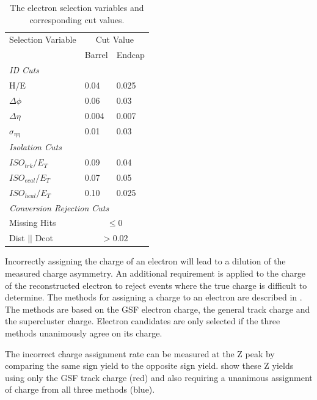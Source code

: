 \begin{table}[htbp]
  \begin{center}
    \leavevmode
    \begin{tabular}{lll} 
    \toprule
      Selection Variable & \multicolumn{2}{c}{Cut Value}\\
                         & Barrel & Endcap\\
      \midrule
      \multicolumn{3}{l}{\emph{ID Cuts}}\\ 
        H/E & 0.04 & 0.025 \\
        $\Delta\phi$ & 0.06 & 0.03 \\
        $\Delta\eta$ & 0.004 & 0.007  \\
        $\sigma_{\eta\eta}$ & 0.01 & 0.03 \\ \midrule
      \multicolumn{3}{l}{\emph{Isolation Cuts}}\\
        $ISO_{trk} / E_T $  & 0.09 & 0.04 \\
        $ISO_{ecal}/ E_T$  & 0.07 & 0.05 \\
        $ISO_{hcal}/ E_T$  & 0.10 & 0.025 \\ \midrule
      \multicolumn{3}{l}{\emph{Conversion Rejection Cuts}}\\ 
        Missing Hits  & \multicolumn{2}{c}{$\leq 0$}\\
        Dist $||$ Dcot   & \multicolumn{2}{c}{$>0.02$}\\
    \bottomrule
    \end{tabular}
    \caption{\label{tab:electronselection}The electron selection variables and corresponding cut values.}
  \end{center}
\end{table}

Incorrectly assigning the charge of an electron will lead to a dilution of the
measured charge asymmetry.  An additional requirement is applied to the charge
of the reconstructed electron to reject events where the true charge is
difficult to determine.  The methods for assigning a charge to an electron are
described in . The methods are based on the GSF electron
charge, the general track charge and the supercluster charge.
Electron candidates are only selected if the three methods unanimously agree on
its charge.

The incorrect charge assignment rate can be measured at the Z peak by comparing the same
sign \HepProcess{\PZ\to\Pepm\Pepm} yield to the opposite sign
\HepProcess{\PZ\to\Pelectron\APelectron} yield.  show these Z yields
using only the \ac{GSF} track charge (red) and also requiring a unanimous
assignment of charge from all three methods (blue). 

